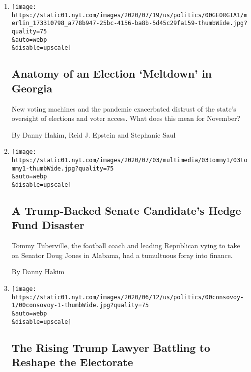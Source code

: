\begin{enumerate}
\def\labelenumi{\arabic{enumi}.}
\item
  \href{/2020/07/25/us/politics/georgia-election-voting-problems.html}{}

  \texttt{[image: https://static01.nyt.com/images/2020/07/19/us/politics/00GEORGIA1/merlin\_173310798\_a778b947-25bc-4156-ba8b-5d45c29fa159-thumbWide.jpg?quality=75\\\&auto=webp\\\&disable=upscale]}

  \hypertarget{anatomy-of-an-election-meltdown-in-georgia}{%
  \subsection{Anatomy of an Election `Meltdown' in
  Georgia}\label{anatomy-of-an-election-meltdown-in-georgia}}

  New voting machines and the pandemic exacerbated distrust of the
  state's oversight of elections and voter access. What does this mean
  for November?

  By Danny Hakim, Reid J. Epstein and Stephanie Saul
\item
  \href{/2020/07/05/us/politics/tommy-tuberville-senate-hedge-fund.html}{}

  \texttt{[image: https://static01.nyt.com/images/2020/07/03/multimedia/03tommy1/03tommy1-thumbWide.jpg?quality=75\\\&auto=webp\\\&disable=upscale]}

  \hypertarget{a-trump-backed-senate-candidates-hedge-fund-disaster}{%
  \subsection{A Trump-Backed Senate Candidate's Hedge Fund
  Disaster}\label{a-trump-backed-senate-candidates-hedge-fund-disaster}}

  Tommy Tuberville, the football coach and leading Republican vying to
  take on Senator Doug Jones in Alabama, had a tumultuous foray into
  finance.

  By Danny Hakim
\item
  \href{/2020/06/15/us/elections/voting-william-consovoy-trump.html}{}

  \texttt{[image: https://static01.nyt.com/images/2020/06/12/us/politics/00consovoy-1/00consovoy-1-thumbWide.jpg?quality=75\\\&auto=webp\\\&disable=upscale]}

  \hypertarget{the-rising-trump-lawyer-battling-to-reshape-the-electorate}{%
  \subsection{The Rising Trump Lawyer Battling to Reshape the
  Electorate}\label{the-rising-trump-lawyer-battling-to-reshape-the-electorate}}


\end{enumerate}
